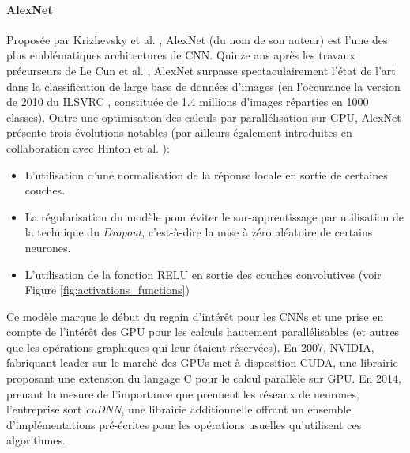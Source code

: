\paragraph{AlexNet}
Proposée par Krizhevsky et al. \cite{krizhevskyImageNetClassificationDeep2012}, AlexNet (du nom de son auteur) est l'une des plus emblématiques architectures de \ac{CNN}. Quinze ans après les travaux précurseurs de Le Cun et al. \cite{lecunGradientbasedLearningApplied1998}, AlexNet surpasse spectaculairement l'état de l'art dans la classification de large base de données d'images (en l'occurance la version de 2010 du \ac{ILSVRC} \cite{dengImageNetLargescaleHierarchical2009}, constituée de 1.4 millions d'images réparties en 1000 classes). Outre une optimisation des calculs par parallélisation sur \ac{GPU}, AlexNet présente trois évolutions notables (par ailleurs également introduites en collaboration avec Hinton et al. \cite{hintonImprovingNeuralNetworks2012}):
\begin{itemize}
	\item L'utilisation d'une normalisation de la réponse locale en sortie de certaines couches.
	\item La régularisation du modèle pour éviter le sur-apprentissage par utilisation de la technique du \textit{Dropout}, c'est-à-dire la mise à zéro aléatoire de certains neurones. 
	\item L'utilisation de la fonction \ac{RELU} en sortie des couches convolutives (voir Figure \ref{fig:activations_functions})
\end{itemize}
Ce modèle marque le début du regain d'intérêt pour les \ac{CNN}s et une prise en compte de l'intérêt des \ac{GPU} pour les calculs hautement parallélisables (et autres que les opérations graphiques qui leur étaient réservées). En 2007, NVIDIA, fabriquant leader sur le marché des \ac{GPU}s met à disposition \ac{CUDA}, une librairie proposant une extension du langage C pour le calcul parallèle sur \ac{GPU}. En 2014, prenant la mesure de l'importance que prennent les réseaux de neurones, l'entreprise sort \textit{cuDNN}, une librairie additionnelle offrant un ensemble d'implémentations pré-écrites pour les opérations usuelles qu'utilisent ces algorithmes.

